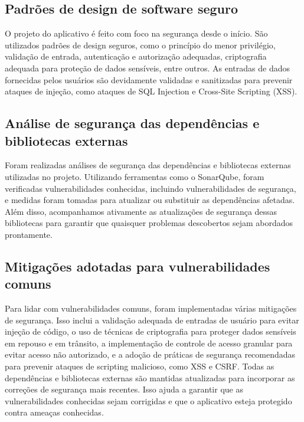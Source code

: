 \documentclass[conference]{IEEEtran}
\begin{document}
\subsection{Padrões de design de software seguro}

O projeto do aplicativo é feito com foco na segurança desde o início. São utilizados padrões de design seguros, como o princípio do menor privilégio, validação de entrada, autenticação e autorização adequadas, criptografia adequada para proteção de dados sensíveis, entre outros. As entradas de dados fornecidas pelos usuários são devidamente validadas e sanitizadas para prevenir ataques de injeção, como ataques de SQL Injection e Cross-Site Scripting (XSS).

\subsection{Análise de segurança das dependências e bibliotecas externas}
Foram realizadas análises de segurança das dependências e bibliotecas externas utilizadas no projeto. Utilizando ferramentas como o SonarQube, foram verificadas vulnerabilidades conhecidas, incluindo vulnerabilidades de segurança, e medidas foram tomadas para atualizar ou substituir as dependências afetadas. Além disso, acompanhamos ativamente as atualizações de segurança dessas bibliotecas para garantir que quaisquer problemas descobertos sejam abordados prontamente.

\subsection{Mitigações adotadas para vulnerabilidades comuns}
Para lidar com vulnerabilidades comuns, foram implementadas várias mitigações de segurança. Isso inclui a validação adequada de entradas de usuário para evitar injeção de código, o uso de técnicas de criptografia para proteger dados sensíveis em repouso e em trânsito, a implementação de controle de acesso granular para evitar acesso não autorizado, e a adoção de práticas de segurança recomendadas para prevenir ataques de scripting malicioso, como XSS e CSRF. Todas as dependências e bibliotecas externas são mantidas atualizadas para incorporar as correções de segurança mais recentes. Isso ajuda a garantir que as vulnerabilidades conhecidas sejam corrigidas e que o aplicativo esteja protegido contra ameaças conhecidas.
\end{document}
